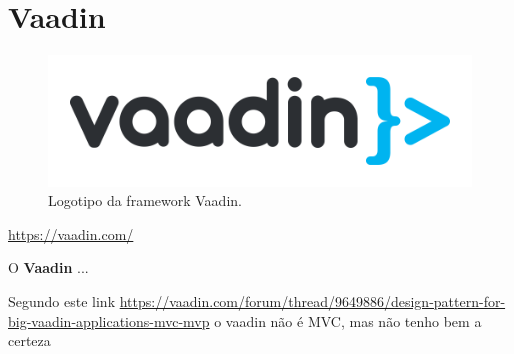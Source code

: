 \section{Vaadin}
\label{subsec:vaadin}

\begin{figure}[H]
    \centering
    \includegraphics[scale=0.12]{images/vaadin.png}
    \caption{Logotipo da framework Vaadin.}
    \label{fig:vaadin}
\end{figure}

\href{https://vaadin.com/}{https://vaadin.com/}

\hspace{5mm} O \textbf{Vaadin} ...

Segundo este link \href{https://vaadin.com/forum/thread/9649886/design-pattern-for-big-vaadin-applications-mvc-mvp}{https://vaadin.com/forum/thread/9649886/design-pattern-for-big-vaadin-applications-mvc-mvp} o vaadin não é MVC, mas não tenho bem a certeza